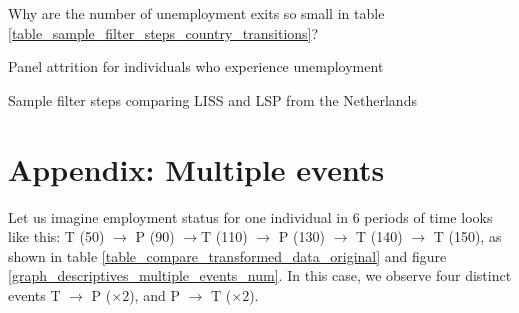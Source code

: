 \begin{table}
    \caption{Why are the number of unemployment exits so small in table \ref{table_sample_filter_steps_country_transitions}?}
    \centering
    \resizebox{\textwidth}{!}{}
    \label{table_sample_unmp_steps_contyp}
\end{table}

\begin{table}
    \caption{Panel attrition for individuals who experience unemployment}
    \centering
    \resizebox{\textwidth}{!}{}
    \label{descriptives_table_unemployment}
\end{table}


\begin{table}[!h]
    \caption{Sample filter steps comparing LISS and LSP from the Netherlands}
    \centering
    \resizebox{\textwidth}{!}{}
    \label{table_sample_filter_steps_country_NE}
\end{table}

\clearpage
\section{Appendix: Multiple events}\label{appendix:multiple}
\setcounter{figure}{0}    
\setcounter{table}{0}    
\renewcommand*\thetable{\Alph{section}.\arabic{table}}
\renewcommand*\thefigure{\Alph{section}.\arabic{figure}}
\renewcommand{\theHfigure}{\Alph{section}.\arabic{table}}
\renewcommand{\theHtable}{\Alph{section}.\arabic{figure}}

Let us imagine employment status for one individual in 6 periods of time looks like this: T (50) $\rightarrow$ P (90) $\rightarrow$T (110) $\rightarrow$ P (130) $\rightarrow$ T (140) $\rightarrow$ T (150), as shown in table \ref{table_compare_transformed_data_original} and figure \ref{graph_descriptives_multiple_events_num}.  In this case, we observe four distinct events T $\rightarrow$ P ($\times 2$), and P $\rightarrow$ T ($\times 2$).  

